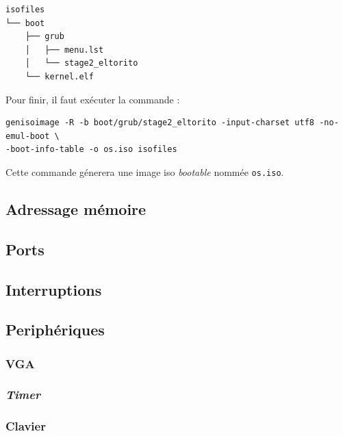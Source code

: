 \documentclass[a4paper]{article}
\begin{document}
\begin{verbatim}
isofiles
└── boot
    ├── grub
    │   ├── menu.lst
    │   └── stage2_eltorito
    └── kernel.elf
\end{verbatim}

Pour finir, il faut exécuter la commande :
\begin{verbatim}
genisoimage -R -b boot/grub/stage2_eltorito -input-charset utf8 -no-emul-boot \
-boot-info-table -o os.iso isofiles
\end{verbatim}
Cette commande génerera une image \acrshort{iso} \textit{bootable} nommée \texttt{os.iso}.


\subsection{Adressage mémoire}


\subsection{Ports}


\subsection{Interruptions}


\subsection{Periphériques}
\subsubsection{VGA}

\subsubsection{\textit{Timer}}

\subsubsection{Clavier}
\end{document}
